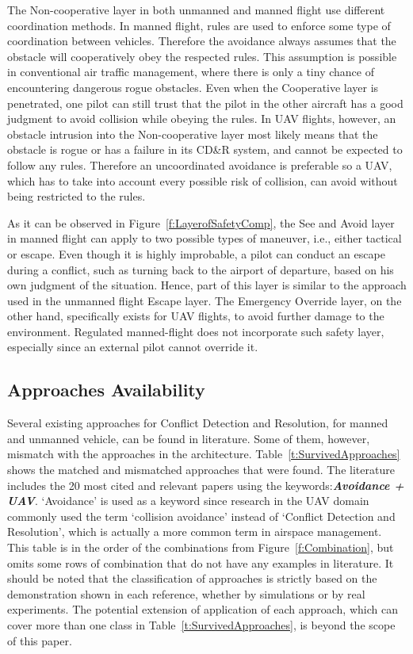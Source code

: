 The Non-cooperative layer in both unmanned and manned flight use different coordination methods. In manned flight, rules are used to enforce some type of coordination between vehicles. Therefore the avoidance always assumes that the obstacle will cooperatively obey the respected rules. This assumption is possible in conventional air traffic management, where there is only a tiny chance of encountering dangerous rogue obstacles. Even when the Cooperative layer is penetrated, one pilot can still trust that the pilot in the other aircraft has a good judgment to avoid collision while obeying the rules. In UAV flights, however, an obstacle intrusion into the Non-cooperative layer most likely means that the obstacle is rogue or has a failure in its CD\&R system, and cannot be expected to follow any rules. Therefore an uncoordinated avoidance is preferable so a UAV, which has to take into account every possible risk of collision, can avoid without being restricted to the rules. %

As it can be observed in Figure~\ref{f:LayerofSafetyComp}, the See and Avoid layer in manned flight can apply to two possible types of maneuver, i.e., either tactical or escape. Even though it is highly improbable, a pilot can conduct an escape during a conflict, such as turning back to the airport of departure, based on his own judgment of the situation. Hence, part of this layer is similar to the approach used in the unmanned flight Escape layer. The Emergency Override layer, on the other hand, specifically exists for UAV flights, to avoid further damage to the environment. Regulated manned-flight does not incorporate such safety layer, especially since an external pilot cannot override it. 


\subsection{Approaches Availability}
Several existing approaches for Conflict Detection and Resolution, for manned and unmanned vehicle, can be found in literature. Some of them, however, mismatch with the approaches in the architecture. Table~\ref{t:SurvivedApproaches} shows the matched and mismatched approaches that were found. The literature includes the 20 most cited and relevant papers using the keywords:\textbf{\textit{Avoidance + UAV}}\footnotemark[5]. `Avoidance' is used as a keyword since research in the UAV domain commonly used the term `collision avoidance' instead of `Conflict Detection and Resolution', which is actually a more common term in airspace management. 
This table is in the order of the combinations from Figure~\ref{f:Combination}, but omits some rows of combination that do not have any examples in literature. It should be noted that the classification of approaches is strictly based on the demonstration shown in each reference, whether by simulations or by real experiments. The potential extension of application of each approach, which can cover more than one class in Table~\ref{t:SurvivedApproaches}, is beyond the scope of this paper.

